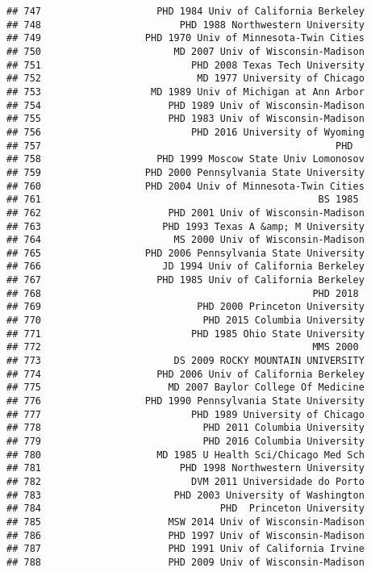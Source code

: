 \documentclass[
]{article}
\begin{document}
\begin{verbatim}
## 747                    PHD 1984 Univ of California Berkeley
## 748                        PHD 1988 Northwestern University
## 749                  PHD 1970 Univ of Minnesota-Twin Cities
## 750                       MD 2007 Univ of Wisconsin-Madison
## 751                          PHD 2008 Texas Tech University
## 752                           MD 1977 University of Chicago
## 753                   MD 1989 Univ of Michigan at Ann Arbor
## 754                      PHD 1989 Univ of Wisconsin-Madison
## 755                      PHD 1983 Univ of Wisconsin-Madison
## 756                          PHD 2016 University of Wyoming
## 757                                                   PHD  
## 758                    PHD 1999 Moscow State Univ Lomonosov
## 759                  PHD 2000 Pennsylvania State University
## 760                  PHD 2004 Univ of Minnesota-Twin Cities
## 761                                                BS 1985 
## 762                      PHD 2001 Univ of Wisconsin-Madison
## 763                     PHD 1993 Texas A &amp; M University
## 764                       MS 2000 Univ of Wisconsin-Madison
## 765                  PHD 2006 Pennsylvania State University
## 766                     JD 1994 Univ of California Berkeley
## 767                    PHD 1985 Univ of California Berkeley
## 768                                               PHD 2018 
## 769                           PHD 2000 Princeton University
## 770                            PHD 2015 Columbia University
## 771                          PHD 1985 Ohio State University
## 772                                               MMS 2000 
## 773                       DS 2009 ROCKY MOUNTAIN UNIVERSITY
## 774                    PHD 2006 Univ of California Berkeley
## 775                      MD 2007 Baylor College Of Medicine
## 776                  PHD 1990 Pennsylvania State University
## 777                          PHD 1989 University of Chicago
## 778                            PHD 2011 Columbia University
## 779                            PHD 2016 Columbia University
## 780                    MD 1985 U Health Sci/Chicago Med Sch
## 781                        PHD 1998 Northwestern University
## 782                          DVM 2011 Universidade do Porto
## 783                       PHD 2003 University of Washington
## 784                               PHD  Princeton University
## 785                      MSW 2014 Univ of Wisconsin-Madison
## 786                      PHD 1997 Univ of Wisconsin-Madison
## 787                      PHD 1991 Univ of California Irvine
## 788                      PHD 2009 Univ of Wisconsin-Madison

\end{verbatim}
\end{document}
